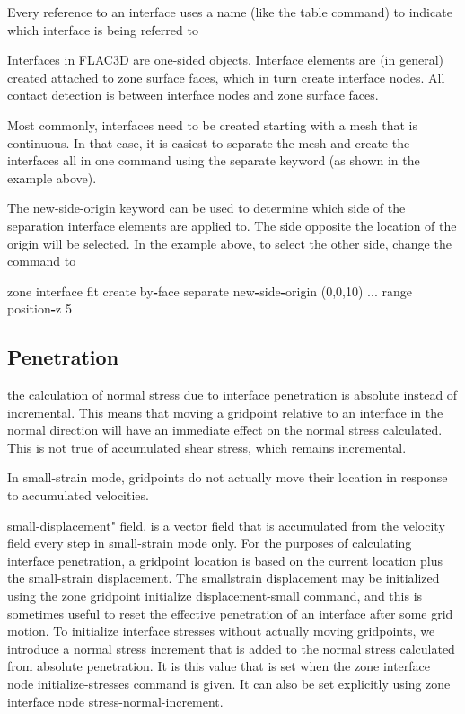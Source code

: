 \documentclass[a4paper, nobind]{templates/ociamthesis}
\newenvironment{Shaded}{\begin{snugshade}}{\end{snugshade}}
\newcommand{\BuiltInTok}[1]{#1}
\newcommand{\DecValTok}[1]{\textcolor[rgb]{0.00,0.00,0.81}{#1}}
\newcommand{\NormalTok}[1]{#1}
\newcommand{\OperatorTok}[1]{\textcolor[rgb]{0.81,0.36,0.00}{\textbf{#1}}}
\newcommand{\StringTok}[1]{\textcolor[rgb]{0.31,0.60,0.02}{#1}}
\renewenvironment{Shaded}
{
  \vspace{10pt}%
  \begin{snugshade}%
}{%
  \end{snugshade}%
  \vspace{8pt}%
}
\begin{document}
Every reference to an interface uses a name (like the table command) to
indicate which interface is being referred to

Interfaces in FLAC3D are one-sided objects. Interface elements are (in
general) created attached to zone surface faces, which in turn create
interface nodes. All contact detection is between interface nodes and
zone surface faces.

Most commonly, interfaces need to be created starting with a mesh that
is continuous. In that case, it is easiest to separate the mesh and
create the interfaces all in one command using the separate keyword (as
shown in the example above).

The new-side-origin keyword can be used to determine which side of the
separation interface elements are applied to. The side opposite the
location of the origin will be selected. In the example above, to select
the other side, change the command to

\begin{Shaded}
\begin{Highlighting}[]
\NormalTok{zone interface }\StringTok{\textquotesingle{}flt\textquotesingle{}}\NormalTok{ create by}\OperatorTok{{-}}\NormalTok{face separate new}\OperatorTok{{-}}\NormalTok{side}\OperatorTok{{-}}\NormalTok{origin (}\DecValTok{0}\NormalTok{,}\DecValTok{0}\NormalTok{,}\DecValTok{10}\NormalTok{) ...}
\BuiltInTok{range}\NormalTok{ position}\OperatorTok{{-}}\NormalTok{z }\DecValTok{5}
\end{Highlighting}
\end{Shaded}

\hypertarget{penetration}{%
\subsection{Penetration}\label{penetration}}

the calculation of normal stress due to interface penetration is
absolute instead of incremental. This means that moving a gridpoint
relative to an interface in the normal direction will have an immediate
effect on the normal stress calculated. This is not true of accumulated
shear stress, which remains incremental.

In small-strain mode, gridpoints do not actually move their location in
response to accumulated velocities.

small-displacement" field. is a vector field that is accumulated from
the velocity field every step in small-strain mode only. For the
purposes of calculating interface penetration, a gridpoint location is
based on the current location plus the small-strain displacement. The
smallstrain displacement may be initialized using the zone gridpoint
initialize displacement-small command, and this is sometimes useful to
reset the effective penetration of an interface after some grid motion.
To initialize interface stresses without actually moving gridpoints, we
introduce a normal stress increment that is added to the normal stress
calculated from absolute penetration. It is this value that is set when
the zone interface node initialize-stresses command is given. It can
also be set explicitly using zone interface node
stress-normal-increment.
\end{document}
